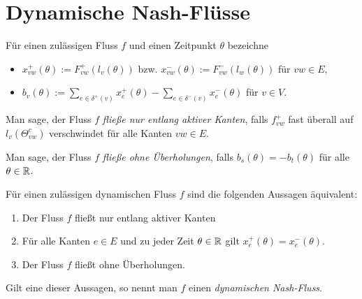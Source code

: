 \section{Dynamische Nash-Flüsse}

\begin{frame}
	
	\begin{definition}
		Für einen zulässigen Fluss $f$ und einen Zeitpunkt $\theta$ bezeichne
		\begin{itemize}[label=\color{darkblue}$\bullet$]
			\item $x_{vw}^+(\theta):= F_{vw}^+(l_v(\theta))$ bzw. $x_{vw}^-(\theta):= F^-_{vw}(l_w(\theta))$ für $vw\in E$,
			\pause\item $b_v(\theta) := \sum_{e\in\delta^+(v)} x_e^+(\theta) - \sum_{e\in\delta^-(v)} x_e^-(\theta)$ für $v\in V$.
		\end{itemize}
	\end{definition}
	
	\pause\begin{definition}\label{def-flow-along-active-edges}
		Man sage, der Fluss $f$ \emph{fließe nur entlang aktiver Kanten}, falls $f_{vw}^+$ fast überall auf $l_v(\Theta_{vw}^c)$ verschwindet für alle Kanten $vw\in E$.
	\end{definition}

	\pause\begin{definition}
	Man sage, der Fluss $f$ \emph{fließe ohne Überholungen}, falls $b_s(\theta) = -b_t(\theta)$ für alle $\theta\in\mathbb{R}$.
	\end{definition}
\end{frame}

\begin{frame}
	\begin{theorem}\label{thm-equivalencies-nash-flow}
		Für einen zulässigen dynamischen Fluss $f$ sind die folgenden Aussagen äquivalent:
		\begin{enumerate}[label=(\roman*)]
			\item Der Fluss $f$ fließt nur entlang aktiver Kanten
			\item Für alle Kanten $e\in E$ und zu jeder Zeit $\theta\in\mathbb{R}$ gilt $x_e^+(\theta) = x_e^-(\theta)$.
			\item Der Fluss $f$ fließt ohne Überholungen.
		\end{enumerate}
		Gilt eine dieser Aussagen, so nennt man $f$ einen \emph{dynamischen Nash-Fluss}.
	\end{theorem}
\end{frame}